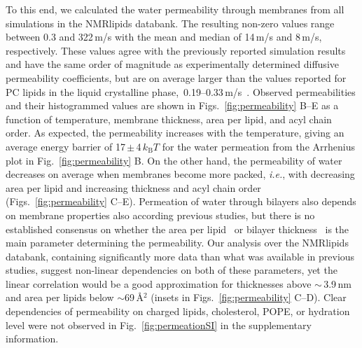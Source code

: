 \documentclass[fleqn,10pt]{wlscirep}
\begin{document}
To this end, we calculated the water permeability through membranes from all simulations in the NMRlipids databank. The resulting non-zero values range between 0.3 and 322\,\textmu{}m/s with the mean and median of 14\,\textmu{}m/s and 8\,\textmu{}m/s, respectively. These values agree with the previously reported simulation results~\cite{venable19,camilo2022} and have the same order of magnitude as experimentally determined diffusive permeability coefficients, but are on average larger than the values reported for PC lipids in the liquid crystalline phase,~0.19--0.33\,\textmu{}m/s~\cite{jansen95}. Observed permeabilities and their histogrammed values are shown in Figs.~\ref{fig:permeability} B--E as a function of temperature, membrane thickness, area per lipid, and acyl chain order. As expected, the permeability increases with the temperature, giving an average energy barrier of 17\,$\pm$\,4\,$k_\mathrm{B}T$ for the water permeation from the Arrhenius plot in Fig.~\ref{fig:permeability} B. On the other hand, the permeability of water decreases on average when membranes become more packed, \textit{i.e.}, with decreasing area per lipid and increasing thickness and acyl chain order (Figs.~\ref{fig:permeability} C--E). Permeation of water through bilayers also depends on membrane properties also according previous studies, but there is no established consensus on whether the area per lipid~\cite{nagle08} or bilayer thickness~\cite{frallicciardi22} is the main parameter determining the permeability. 
Our analysis over the NMRlipids databank, containing significantly more data than what was available in previous studies, suggest non-linear dependencies on both of these parameters, yet the linear correlation would be a good approximation for thicknesses above $\sim$\,3.9\,nm and area per lipids below $\sim$69\,\AA{}$^2$ (insets in Figs.~\ref{fig:permeability} C--D).
Clear dependencies of permeability on charged lipids, cholesterol, POPE, or hydration level were not observed in Fig.~\ref{fig:permeationSI} in the supplementary information.
%
%
%
\end{document}

